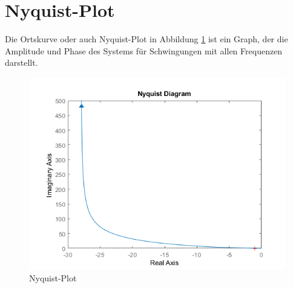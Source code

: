 \section{Nyquist-Plot}

Die Ortskurve oder auch Nyquist-Plot in Abbildung \ref{fig:nyquist-plot} ist ein Graph, der die Amplitude und Phase des Systems für Schwingungen mit allen Frequenzen darstellt.

\begin{figure}[H]
	\centering
	\includegraphics[width=0.7\linewidth]{diagrams/nyquistDiagram.png}
	\caption[Nyquist-Plot]{Nyquist-Plot}
	\label{fig:nyquist-plot}
\end{figure}